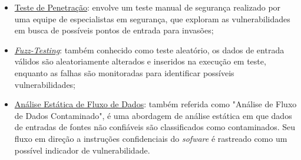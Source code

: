    \begin{itemize}
        \item \underline{Teste de Penetração}: envolve um teste manual de segurança realizado por uma equipe de especialistas em segurança, que exploram as vulnerabilidades em busca de possíveis pontos de entrada para invasões;
        \item \underline{\textit{Fuzz-Testing}}: também conhecido como teste aleatório, os dados de entrada válidos são aleatoriamente alterados e inseridos na execução em teste, enquanto as falhas são monitoradas para identificar possíveis vulnerabilidades;
        \item \underline{Análise Estática de Fluxo de Dados}: também referida como "Análise de Fluxo de Dados Contaminado", é uma abordagem de análise estática em que dados de entradas de fontes não confiáveis são classificados como contaminados. Seu fluxo em direção a instruções confidenciais do \textit{sofware} é rastreado como um possível indicador de vulnerabilidade.
    \end{itemize}

